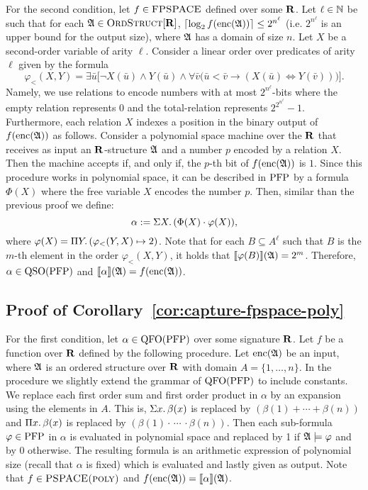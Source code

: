 For the second condition, let $f\in \text{\sc FPSPACE}$ defined over some $\mathbf{R}$. Let $\ell\in\mathbb{N}$ be such that for each $\mathfrak{A}\in\text{\sc OrdStruct}[\mathbf{R}]$, $\lceil\log_2 f({\rm enc}(\mathfrak{A})) \rceil \leq 2^{n^\ell}$ (i.e. $2^{n^\ell}$ is an upper bound for the output size), where $\mathfrak{A}$ has a domain of size $n$. Let $X$ be a second-order variable of arity $\ell$. Consider a linear order over predicates of arity $\ell$ given by the formula 
$$
\varphi_{<}(X,Y) = \exists\bar{u}\big[\neg X(\bar{u})\wedge Y(\bar{u})\wedge \forall\bar{v}\big(
\bar{u}<\bar{v}\to(X(\bar{u})\iff Y(\bar{v}))\big)\big].
$$
Namely, we use relations to encode numbers with at most $2^{n^\ell}$-bits where the empty relation represents $0$ and the total-relation represents $2^{2^{n^\ell}}-1$.
Furthermore, each relation $X$ indexes a position in the binary output of $f({\rm enc}(\mathfrak{A}))$ as follows.
Consider a polynomial space machine over the $\mathbf{R}$ that receives as input an $\mathbf{R}$-structure $\mathfrak{A}$ and a number $p$ encoded by a relation $X$. Then the machine accepts if, and only if, the $p$-th bit of $f({\rm enc}(\mathfrak{A}))$ is $1$. 
Since this procedure works in polynomial space, it can be described in ${\rm PFP}$ \cite{AbiteboulV89} by a formula $\Phi(X)$ where the free variable $X$ encodes the number $p$. Then, similar than the previous proof we define:
$$
\alpha := \Sigma{X}.\,(\Phi(X)\cdot\varphi(X)),
$$ 
where $\varphi(X) = \Pi{Y}.\,(\varphi_{<}(Y,X)\mapsto 2)$. Note that for each $B\subseteq A^{\ell}$ such that $B$ is the $m$-th element in the order $\varphi_{<}(X,Y)$, it holds that ${\llbracket{}{\varphi(B)}\rrbracket}(\mathfrak{A}) = 2^m$. Therefore, $\alpha\in{\rm QSO}({\rm PFP})$ and ${\llbracket{}{\alpha}\rrbracket}(\mathfrak{A}) = f({\rm enc}(\mathfrak{A}))$.

\medskip


\subsection*{Proof of Corollary~\ref{cor:capture-fpspace-poly}}

For the first condition, let $\alpha\in{\rm QFO}({\rm PFP})$ over some signature $\mathbf{R}$. Let $f$ be a function over $\mathbf{R}$ defined by the following procedure. Let ${\rm enc}(\mathfrak{A})$ be an input, where $\mathfrak{A}$ is an ordered structure over $\mathbf{R}$ with domain $A = \{1,\ldots,n\}$. In the procedure we slightly extend the grammar of ${\rm QFO}({\rm PFP})$ to include constants. We replace each first order sum and first order product in $\alpha$ by an expansion using the elements in $A$. This is, $\Sigma{x}.\, \beta(x)$ is replaced by $(\beta(1)+\cdots+\beta(n))$ and $\Pi{x}.\,\beta(x)$ is replaced by $(\beta(1)\cdot\,\cdots\,\cdot\beta(n))$. Then each sub-formula $\varphi\in{\rm PFP}$ in $\alpha$ is evaluated in polynomial space and replaced by 1 if $\mathfrak{A}\models\varphi$ and by 0 otherwise. The resulting formula is an arithmetic expression of polynomial size  (recall that $\alpha$ is fixed) which is evaluated and lastly given as output. Note that $f\in\text{\sc PSPACE(poly)}$ and $f({\rm enc}(\mathfrak{A})) = {\llbracket{}{\alpha}\rrbracket}(\mathfrak{A})$.

